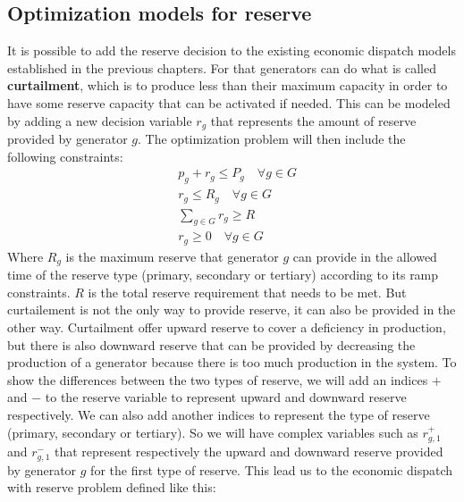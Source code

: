 \documentclass[12pt, openany]{report}
\theoremstyle{definition}
\begin{document}
\subsection{Optimization models for reserve}
It is possible to add the reserve decision to the existing economic dispatch models established in the previous chapters. For that generators can do what is called \textbf{curtailment}, which is to produce less than their maximum capacity in order to have some reserve capacity that can be activated if needed. This can be modeled by adding a new decision variable $r_g$ that represents the amount of reserve provided by generator $g$. The optimization problem will then include the following constraints:
\begin{equation}
    \begin{aligned}
        & p_g + r_g \leq P_g \quad \forall g \in G \\
        & r_g \leq R_g \quad \forall g \in G \\
        & \sum_{g \in G} r_g \geq R \\
        & r_g \geq 0 \quad \forall g \in G
    \end{aligned}
\end{equation}
Where $R_g$ is the maximum reserve that generator $g$ can provide in the allowed time of the reserve type (primary, secondary or tertiary) according to its ramp constraints. $R$ is the total reserve requirement that needs to be met. But curtailement is not the only way to provide reserve, it can also be provided in the other way. Curtailment offer upward reserve to cover a deficiency in production, but there is also downward reserve that can be provided by decreasing the production of a generator because there is too much production in the system. To show the differences between the two types of reserve, we will add an indices $+$ and $-$ to the reserve variable to represent upward and downward reserve respectively. We can also add another indices to represent the type of reserve (primary, secondary or tertiary). So we will have complex variables such as $r_{g,1}^+$ and $r_{g,1}^-$ that represent respectively the upward and downward reserve provided by generator $g$ for the first type of reserve. This lead us to the economic dispatch with reserve problem defined like this:
\end{document}
